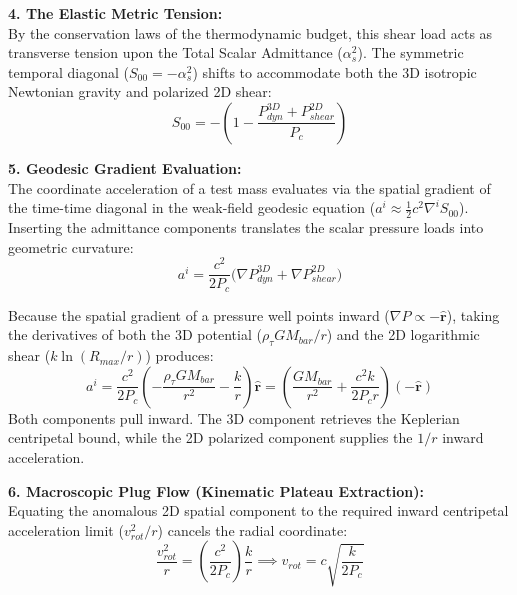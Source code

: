 \textbf{4. The Elastic Metric Tension:} \\ 
By the conservation laws of the thermodynamic budget, this shear load acts as transverse tension upon the Total Scalar Admittance ($\alpha_s^2$). The symmetric temporal diagonal ($S_{00} = -\alpha_s^2$) shifts to accommodate both the 3D isotropic Newtonian gravity and polarized 2D shear:
\begin{equation}
    S_{00} = -\left( 1 - \frac{P_{dyn}^{3D} + P_{shear}^{2D}}{P_c} \right) \label{eq:modified_temporal_diagonal}
\end{equation}

\textbf{5. Geodesic Gradient Evaluation:} \\
The coordinate acceleration of a test mass evaluates via the spatial gradient of the time-time diagonal in the weak-field geodesic equation ($a^i \approx \frac{1}{2}c^2 \nabla^i S_{00}$). Inserting the admittance components translates the scalar pressure loads into geometric curvature: 
\begin{equation}
    a^i = \frac{c^2}{2 P_c} \big( \nabla P_{dyn}^{3D} + \nabla P_{shear}^{2D} \big)
\end{equation}

Because the spatial gradient of a pressure well points inward ($\nabla P \propto - \mathbf{\hat{r}}$), taking the derivatives of both the 3D potential ($\rho_\tau GM_{bar}/r$) and the 2D logarithmic shear ($k \ln(R_{max}/r)$) produces: 
\begin{equation}
    a^i = \frac{c^2}{2 P_c} \left( -\frac{\rho_\tau G M_{bar}}{r^2} - \frac{k}{r} \right) \mathbf{\hat{r}} = \left( \frac{G M_{bar}}{r^2} + \frac{c^2 k}{2 P_c r} \right) (-\mathbf{\hat{r}})
\end{equation}
Both components pull inward. The 3D component retrieves the Keplerian centripetal bound, while the 2D polarized component supplies the $1/r$ inward acceleration. 

\vspace{0.2 cm}

\textbf{6. Macroscopic Plug Flow (Kinematic Plateau Extraction):} \\ 
Equating the anomalous 2D spatial component to the required inward centripetal acceleration limit ($v_{rot}^2/r$) cancels the radial coordinate:
\begin{equation}
    \frac{v_{rot}^2}{r} = \left( \frac{c^2}{2 P_c} \right) \frac{k}{r} \implies v_{rot} = c \sqrt{ \frac{k}{2 P_c} } \label{eq:plug_flow_plateau}
\end{equation}


